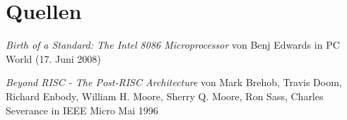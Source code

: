\section{Quellen}

\begin{thebibliography}{9}

  \emph{Birth of a Standard: The Intel 8086 Microprocessor}
	von Benj Edwards
	in PC World (17. Juni 2008)

	\emph{Beyond RISC - The Post-RISC Architecture}
	von Mark Brehob, Travis Doom, Richard Enbody, William H. Moore, Sherry Q. Moore, Ron Sass, Charles Severance
	in IEEE Micro Mai 1996

\end{thebibliography}
